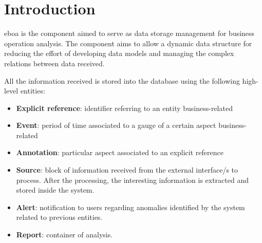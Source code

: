 \chapter{Introduction}\label{c:intro}

\acrshort{eboa} is the component aimed to serve as data storage management for business operation analysis. The component aims to allow a dynamic data structure for reducing the effort of developing data models and managing the complex relations between data received.

All the information received is stored into the database using the following high-level entities:

\begin{itemize}

\item \textbf{Explicit reference}: identifier referring to an entity business-related
\item \textbf{Event}: period of time associated to a gauge of a certain aspect business-related
\item \textbf{Annotation}: particular aspect associated to an explicit reference
\item \textbf{Source}: block of information received from the external interface/s to process. After the processing, the interesting information is extracted and stored inside the system.
\item \textbf{Alert}: notification to users regarding anomalies identified by the system related to previous entities.
\item \textbf{Report}: container of analysis.

\end{itemize}

